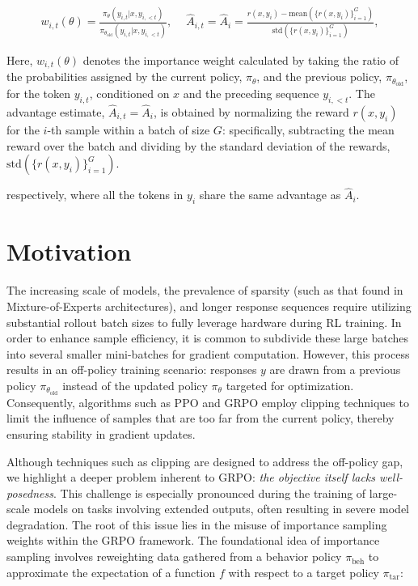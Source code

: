 \begin{align}
    w_{i,t}(\theta)=\frac{ \pi_{\theta} (y_{i,t} | x, y_{i,<t}) }{ \pi_{\theta_\text{old}} (y_{i,t} | x,y_{i,<t}) },\quad\ 
    \widehat{A}_{i,t} = \widehat{A}_{i} = \frac{ r(x, y_i) - \mathrm{mean} \left( \{ r(x, y_i) \}_{i=1}^G \right) }{ \mathrm{std} \left( \{ r(x, y_i) \}_{i=1}^G \right) },
\end{align}

Here, $w_{i,t}(\theta)$ denotes the importance weight calculated by taking the ratio of the probabilities assigned by the current policy, $\pi_\theta$, and the previous policy, $\pi_{\theta_\text{old}}$, for the token $y_{i,t}$, conditioned on $x$ and the preceding sequence $y_{i,<t}$. The advantage estimate, $\widehat{A}_{i,t} = \widehat{A}_{i}$, is obtained by normalizing the reward $r(x, y_i)$ for the $i$-th sample within a batch of size $G$: specifically, subtracting the mean reward over the batch and dividing by the standard deviation of the rewards, $\mathrm{std}\left(\{ r(x, y_i) \}_{i=1}^G \right)$.

respectively, where all the tokens in $y_i$ share the same advantage as $\widehat{A}_{i}$.

\section{Motivation}
\label{sec:motivation}

The increasing scale of models, the prevalence of sparsity (such as that found in Mixture-of-Experts architectures), and longer response sequences require utilizing substantial rollout batch sizes to fully leverage hardware during RL training. In order to enhance sample efficiency, it is common to subdivide these large batches into several smaller mini-batches for gradient computation. However, this process results in an off-policy training scenario: responses $y$ are drawn from a previous policy $\pi_{\theta_\text{old}}$ instead of the updated policy $\pi_\theta$ targeted for optimization. Consequently, algorithms such as PPO and GRPO employ clipping techniques to limit the influence of samples that are too far from the current policy, thereby ensuring stability in gradient updates.

Although techniques such as clipping are designed to address the off-policy gap, we highlight a deeper problem inherent to GRPO: \textit{the objective itself lacks well-posedness}. This challenge is especially pronounced during the training of large-scale models on tasks involving extended outputs, often resulting in severe model degradation. The root of this issue lies in the misuse of importance sampling weights within the GRPO framework. The foundational idea of importance sampling involves reweighting data gathered from a behavior policy $\pi_\text{beh}$ to approximate the expectation of a function $f$ with respect to a target policy $\pi_\text{tar}$:

